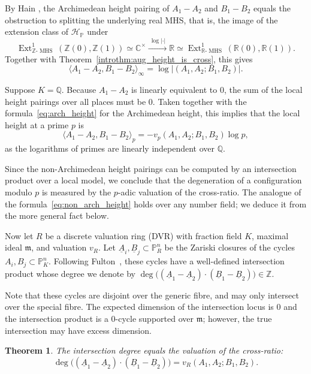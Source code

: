 \documentclass[11pt,a4paper]{amsart}
\newcommand{\C}{\mathbb{C}}
\newcommand{\Pp}{\mathbb{P}}
\newcommand{\pn}{\mathbb{P}^{n}}
\newcommand{\Q}{\mathbb{Q}}
\newcommand{\R}{\mathbb{R}}
\newcommand{\Z}{\mathbb{Z}}
\newcommand{\xm}{\mathfrak{m}}
\DeclareMathOperator{\Ext}{Ext}
\theoremstyle{plain}
\newtheorem{introtheorem}{Theorem}       %
\theoremstyle{definition}
\theoremstyle{remark}
\DeclareMathOperator{\MHS}{MHS}
\newcommand{\ZMHS}{\Z\text{-}\MHS}
\newcommand{\RMHS}{\R\text{-}\MHS}
\newcommand{\ch}{\mathcal{H}}
\begin{document}
  \medskip

 By Hain \cite[Prop.~3.3.7]{Hain1990}, the Archimedean height pairing of $A_1-A_2$ and $B_1-B_2$ equals the obstruction to splitting the underlying real MHS, that is, the image of the extension class of $\ch_\Pp$ under
\[
\Ext^1_{\ZMHS}(\Z(0),\Z(1))\simeq\C^\times \xrightarrow{\ \log|\cdot|\ } \R \simeq \Ext^1_{\RMHS}(\R(0),\R(1)).
\]
Together with Theorem~\ref{introthm:aug_height_is_cross}, this gives
\begin{equation}\label{eq:arch_height}
\langle A_1-A_2,B_1-B_2\rangle_\infty = \log|(A_1,A_2;B_1,B_2)|.
\end{equation}

Suppose $K=\Q$. Because $A_1-A_2$ is linearly equivalent to $0$, the sum of the local height pairings over all places must be $0$. Taken together with the formula~\eqref{eq:arch_height} for the Archimedean height, this implies that the local height at a prime $p$ is
\begin{equation}\label{eq:non_arch_height}
    \langle A_1-A_2,B_1-B_2\rangle_p = -v_p(A_1,A_2;B_1,B_2)\log p,
\end{equation}
as the logarithms of primes are linearly independent over $\Q$. 

Since the non-Archimedean height pairings can be computed by an intersection product over a local model, we conclude that the degeneration of a configuration modulo $p$ is measured by the $p$-adic valuation of the cross-ratio. The analogue of the formula~\eqref{eq:non_arch_height} holds over any number field; we deduce it from the more general fact below.

\medskip

Now let $R$ be a discrete valuation ring (DVR) with fraction field $K$, maximal ideal $\xm$, and valuation $v_R$. Let $\underline A_i,\underline B_j\subset\pn_R$ be the Zariski closures of the cycles $A_i,B_j \subset \pn_K$. Following Fulton~\cite[Ch.~20]{Fulton1998}, these cycles have a well-defined intersection product whose degree we denote by $\deg\big((\underline A_1-\underline A_2)\cdot(\underline B_1-\underline B_2)\big)\in\Z$.

Note that these cycles are disjoint over the generic fibre, and may only intersect over the special fibre. The expected dimension of the intersection locus is $0$ and the intersection product is a $0$-cycle supported over $\xm$; however, the true intersection may have excess dimension.

\begin{introtheorem}\label{introthm:dvr}
    The intersection degree equals the valuation of the cross-ratio: 
   \[ \deg\big((\underline A_1-\underline A_2)\cdot(\underline B_1-\underline B_2)\big) = v_R(A_1,A_2;B_1,B_2).\]
\end{introtheorem}
\end{document}
